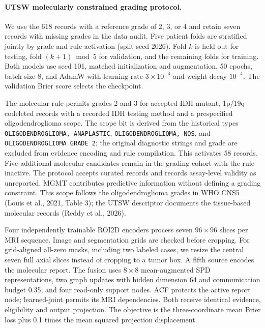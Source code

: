 {\color{blue}
\paragraph{UTSW molecularly constrained grading protocol.}
We use the 618 records with a reference grade of 2, 3, or 4 and retain seven records with missing grades in the data audit. Five patient folds are stratified jointly by grade and rule activation (split seed 2026). Fold $k$ is held out for testing, fold $(k+1)\bmod 5$ for validation, and the remaining folds for training. Both models use seed 101, matched initialization and augmentation, 50 epochs, batch size 8, and AdamW with learning rate $3\times10^{-4}$ and weight decay $10^{-4}$. The validation Brier score selects the checkpoint.

The molecular rule permits grades 2 and 3 for accepted IDH-mutant, 1p/19q-codeleted records with a recorded IDH testing method and a prespecified oligodendroglioma scope. The scope bit is derived from the historical types \texttt{OLIGODENDROGLIOMA, ANAPLASTIC}, \texttt{OLIGODENDROGLIOMA, NOS}, and \texttt{OLIGODENDROGLIOMA GRADE 2}; the original diagnostic strings and grade are excluded from evidence encoding and rule compilation. This activates 58 records. Five additional molecular candidates remain in the grading cohort with the rule inactive. The protocol accepts curated records and records assay-level validity as unreported. MGMT contributes predictive information without defining a grading constraint. This scope follows the oligodendroglioma grades in WHO CNS5 (Louis et al., 2021, Table 3); the UTSW descriptor documents the tissue-based molecular records (Reddy et al., 2026).

Four independently trainable ROI2D encoders process seven $96\times96$ slices per MRI sequence. Image and segmentation grids are checked before cropping. For grid-aligned all-zero masks, including two labeled cases, we resize the central seven full axial slices instead of cropping to a tumor box. A fifth source encodes the molecular report. The fusion uses $8\times8$ mean-augmented SPD representations, two graph updates with hidden dimension 64 and communication budget 0.35, and four read-only support nodes. ACF protects the active report node; learned-joint permits its MRI dependencies. Both receive identical evidence, eligibility and output projection. The objective is the three-coordinate mean Brier loss plus 0.1 times the mean squared projection displacement.

}
